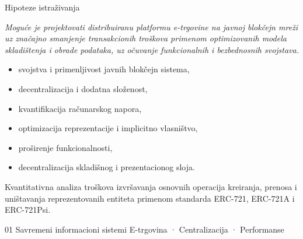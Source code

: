 \begin{frame}{Hipoteze istraživanja}

\vspace{-0.3cm}

\vspace{-0.1cm}

\emph{Moguće je projektovati distribuiranu platformu e-trgovine na javnoj blokčejn mreži uz značajno smanjenje transakcionih troškova primenom optimizovanih modela skladištenja i obrade podataka, uz očuvanje funkcionalnih i bezbednosnih svojstava.}

\vspace{-0.2cm}
\begin{itemize}
    \item svojstva i primenljivost javnih blokčejn sistema,
    \item decentralizacija i dodatna složenost,
    \item kvantifikacija računarskog napora,
    \item optimizacija reprezentacije i implicitno vlasništvo,
    \item proširenje funkcionalnosti,
    \item decentralizacija skladišnog i prezentacionog sloja.
\end{itemize}

\vspace{-0.1cm}

Kvantitativna analiza troškova izvršavanja osnovnih operacija kreiranja, prenosa i uništavanja reprezentovanih entiteta primenom standarda ERC-721, ERC-721A i ERC-721Psi.

\end{frame}


\sectionframe
    {01}
    {Savremeni informacioni sistemi}
    {E-trgovina · Centralizacija · Performanse}


